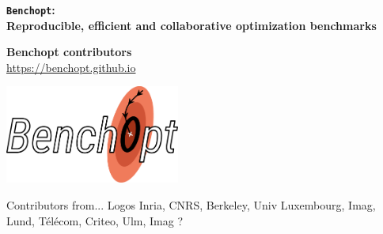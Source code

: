 \documentclass[unknownkeysallowed]{beamer}
\begin{document}


\begin{frame}
\bigskip
\bigskip
\begin{center}{
\LARGE\color{marron}
\textbf{\texttt{Benchopt}:\\
Reproducible, efficient and collaborative optimization benchmarks}
\textbf{ }\\
}

\color{marron}
\end{center}

\vspace{0.5cm}

\begin{center}
\textbf{Benchopt contributors} \\
\vspace{0.1cm}
\url{https://benchopt.github.io}\\
\end{center}

\centering
\includegraphics[width=0.43\textwidth]{../logo/benchopt_logo.pdf}

\end{frame}

\begin{frame}{Contributors from...}
Logos Inria, CNRS, Berkeley, Univ Luxembourg, Imag, Lund, Télécom, Criteo, Ulm, Imag ?
\end{frame}
\end{document}
